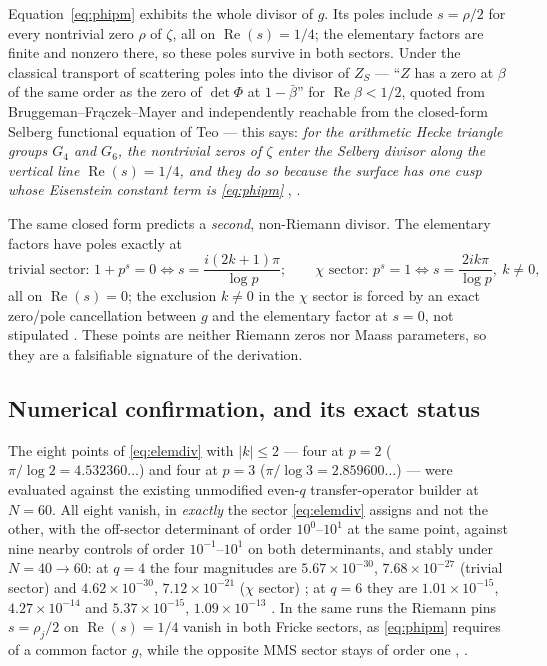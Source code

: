 \documentclass[11pt]{article}
\theoremstyle{definition}
\theoremstyle{remark}
\renewcommand{\Re}{\operatorname{Re}}
\begin{document}
Equation~\eqref{eq:phipm} exhibits the whole divisor of $g$. Its poles
include $s = \rho/2$ for every nontrivial zero $\rho$ of $\zeta$, all on
$\Re(s) = 1/4$; the elementary factors are finite and nonzero there, so
these poles survive in both sectors. Under the classical transport of
scattering poles into the divisor of $Z_S$ --- ``$Z$ has a zero at
$\beta$ of the same order as the zero of $\det\Phi$ at $1-\bar\beta$''
for $\Re\beta < 1/2$, quoted from Bruggeman--Fr\k{a}czek--Mayer
\cite{BFM13} and independently reachable from the closed-form Selberg
functional equation of Teo \cite{Teo20} --- this says: \emph{for the
arithmetic Hecke triangle groups $G_4$ and $G_6$, the nontrivial zeros
of $\zeta$ enter the Selberg divisor along the vertical line
$\Re(s) = 1/4$, and they do so because the surface has one cusp whose
Eisenstein constant term is \eqref{eq:phipm}} \cite[\S5]{M1F},
\cite{LawU3}.

The same closed form predicts a \emph{second}, non-Riemann divisor. The
elementary factors have poles exactly at
\begin{equation}
\label{eq:elemdiv}
\text{trivial sector: } 1 + p^s = 0
\iff s = \frac{i(2k+1)\pi}{\log p};
\qquad
\text{$\chi$ sector: } p^s = 1
\iff s = \frac{2ik\pi}{\log p},\ k \ne 0,
\end{equation}
all on $\Re(s) = 0$; the exclusion $k \ne 0$ in the $\chi$ sector is
forced by an exact zero/pole cancellation between $g$ and the elementary
factor at $s = 0$, not stipulated \cite[\S5.3]{M1F}. These points are
neither Riemann zeros nor Maass parameters, so they are a falsifiable
signature of the derivation.

\subsection{Numerical confirmation, and its exact status}

The eight points of \eqref{eq:elemdiv} with $|k| \le 2$ --- four at
$p=2$ ($\pi/\log 2 = 4.532360\ldots$) and four at $p=3$
($\pi/\log 3 = 2.859600\ldots$) --- were evaluated against the existing
unmodified even-$q$ transfer-operator builder at $N = 60$. All eight
vanish, in \emph{exactly} the sector \eqref{eq:elemdiv} assigns and not
the other, with the off-sector determinant of order $10^0$--$10^1$ at
the same point, against nine nearby controls of order $10^{-1}$--$10^1$
on both determinants, and stably under $N = 40 \to 60$: at $q=4$ the
four magnitudes are $5.67\times 10^{-30}$, $7.68\times 10^{-27}$
(trivial sector) and $4.62\times 10^{-30}$, $7.12\times 10^{-21}$
($\chi$ sector) \cite[\S6.2]{M1D}; at $q=6$ they are
$1.01\times 10^{-15}$, $4.27\times 10^{-14}$ and
$5.37\times 10^{-15}$, $1.09\times 10^{-13}$ \cite[\S4.2]{M1E}. In the
same runs the Riemann pins $s = \rho_j/2$ on $\Re(s) = 1/4$ vanish in
both Fricke sectors, as \eqref{eq:phipm} requires of a common factor
$g$, while the opposite MMS sector stays of order one
\cite[\S6.1]{M1D}, \cite[\S4.1]{M1E}.
\end{document}
